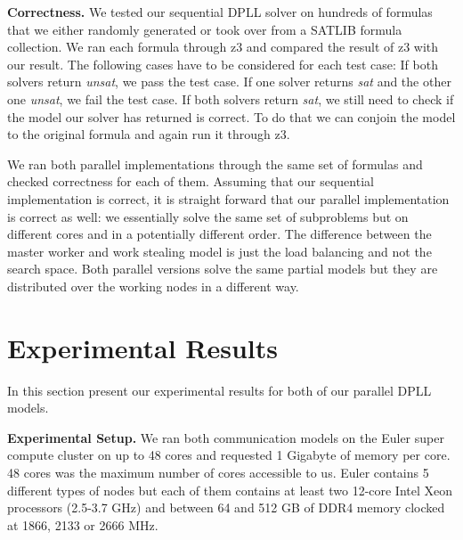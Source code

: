 \documentclass[letterpaper]{article}
\newcommand{\mypar}[1]{{\bf #1.}}
\begin{document}
\mypar{Correctness}
We tested our sequential DPLL solver on hundreds of formulas that we either randomly generated or took over from a SATLIB formula collection. \cite{cnf_website}
We ran each formula through z3 \cite{z3} and compared the result of z3 with our result.
The following cases have to be considered for each test case:
If both solvers return \textit{unsat}, we pass the test case.
If one solver returns \textit{sat} and the other one \textit{unsat}, we fail the test case.
If both solvers return \textit{sat}, we still need to check if the model our solver has returned is correct.
To do that we can conjoin the model to the original formula and again run it through z3.

We ran both parallel implementations through the same set of formulas and checked correctness for each of them.
Assuming that our sequential implementation is correct, it is straight forward that our parallel implementation is correct as well:
we essentially solve the same set of subproblems but on different cores and in a potentially different order.
The difference between the master worker and work stealing model is just the load balancing and not the search space.
Both parallel versions solve the same partial models but they are distributed over the working nodes in a different way.

\section{Experimental Results}\label{sec:exp}
In this section present our experimental results for both of our parallel DPLL models.

\mypar{Experimental Setup}
We ran both communication models on the Euler super compute cluster \cite{euler} on up to 48 cores and requested 1 Gigabyte of memory per core.
48 cores was the maximum number of cores accessible to us.
Euler contains 5 different types of nodes but each of them contains at least two 12-core Intel Xeon processors (2.5-3.7 GHz) and between 64 and 512 GB of DDR4 memory clocked at 1866, 2133 or 2666 MHz.
\end{document}
